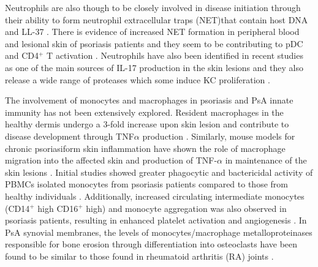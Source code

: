 Neutrophils are also though to be closely involved in disease initiation through their ability to form neutrophil extracellular traps (NET)that contain host DNA and LL-37 \parencite{Hu2016}. There is evidence of increased NET formation in peripheral blood and lesional skin of psoriasis patients and they seem to be contributing to pDC and CD4$^+$ T activation \parencite{Hu2016}. Neutrophils have also been identified in recent studies as one of the main sources of IL-17 production in the skin lesions \parencite{Lin2011} and they also release a wide range of proteases which some induce KC proliferation \parencite{Mahil2006}.


%
%


The involvement of monocytes and macrophages in psoriasis and PsA innate immunity has not been extensively explored. Resident macrophages in the healthy dermis undergo a 3-fold increase upon skin lesion and contribute to disease development through TNF$\alpha$ production \parencite{Perera2012, Mahil2016}. Similarly, mouse models for chronic psoriasiform skin inflammation have shown the role of macrophage migration into the affected skin and production of TNF-$\alpha$ in maintenance of the skin lesions \parencite{Stratis2006, Wang2006}. Initial studies showed greater phagocytic and bactericidal activity of PBMCs isolated monocytes from psoriasis patients compared to those from healthy individuals \parencite{Bar-Eli1979}. Additionally, increased circulating intermediate monocytes (CD14$^+$ high CD16$^+$ high) and monocyte aggregation was also observed in psoriasis patients, resulting in enhanced platelet activation and angiogenesis \parencite {Golden2015}. In PsA synovial membranes, the levels of monocytes/macrophage metalloproteinases responsible for bone erosion through differentiation into osteoclasts  have been found to be similar to those  found in rheumatoid arthritis (RA) joints \parencite{Hitchon2002}. 

